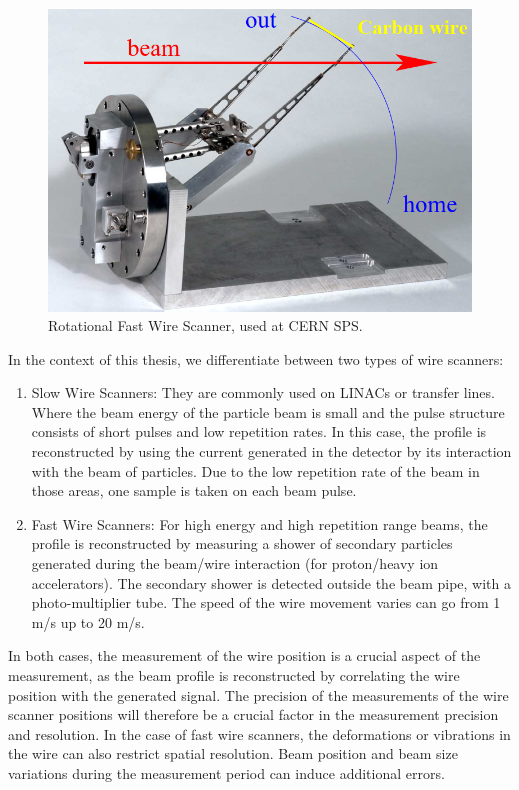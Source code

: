 \begin{figure}[h]
    \centering
    \includegraphics[width=0.6\columnwidth]{WireScanner/WireScanner.png}
    \caption{Rotational Fast Wire Scanner, used at CERN SPS. }
    \label{fig:WireScan}
\end{figure}

In the context of this thesis, we differentiate between two types of wire scanners:

\begin{enumerate}
    \item Slow Wire Scanners: They are commonly used on LINACs or transfer lines. Where the beam energy of the particle beam is small and the pulse structure consists of short pulses and low repetition rates. In this case, the profile is reconstructed by using the current generated in the detector by its interaction with the beam of particles. Due to the low repetition rate of the beam in those areas, one sample is taken on each beam pulse.
    \item Fast Wire Scanners: For high energy and high repetition range beams, the profile is reconstructed by measuring a shower of secondary particles generated during the beam/wire interaction (for proton/heavy ion accelerators).  The secondary shower is detected outside the beam pipe, with a photo-multiplier tube. The speed of the wire movement varies can go from 1 \si[]{\metre /\second} up to 20 \si[]{\meter /\second}. 
\end{enumerate}

In both cases, the measurement of the wire position is a crucial aspect of the measurement, as the beam profile is reconstructed by correlating the wire position with the generated signal. The precision of the measurements of the wire scanner positions will therefore be a crucial factor in the measurement precision and resolution. In the case of fast wire scanners, the deformations or vibrations in the wire can also restrict spatial resolution. Beam position and beam size variations during the measurement period can induce additional errors. 

